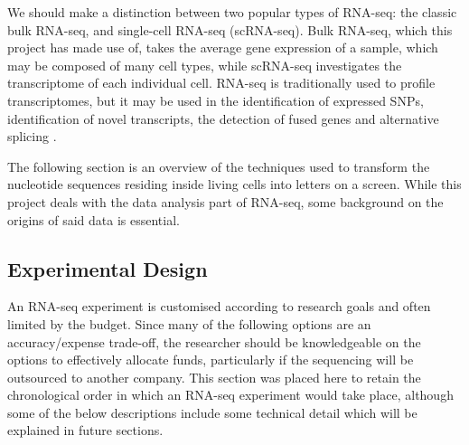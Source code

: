 We should make a distinction between two popular types of RNA-seq: the classic bulk RNA-seq, and single-cell RNA-seq (scRNA-seq). Bulk RNA-seq, which this project has made use of, takes the average gene expression of a sample, which may be composed of many cell types, while scRNA-seq investigates the transcriptome of each individual cell. RNA-seq is traditionally used to profile transcriptomes, but it may be used in the identification of expressed SNPs, identification of novel transcripts, the detection of fused genes and alternative splicing \citep{han2015alternative, zhao2014comparison}. 

The following section is an overview of the techniques used to transform the nucleotide sequences residing inside living cells into letters on a screen. While this project deals with the data analysis part of RNA-seq, some background on the origins of said data is essential. 


\subsection{Experimental Design}


An RNA-seq experiment is customised according to research goals and often limited by the budget. Since many of the following options are an accuracy/expense trade-off, the researcher should be knowledgeable on the options to effectively allocate funds, particularly if the sequencing will be outsourced to another company. This section was placed here to retain the chronological order in which an RNA-seq experiment would take place, although some of the below descriptions include some technical detail which will be explained in future sections.

